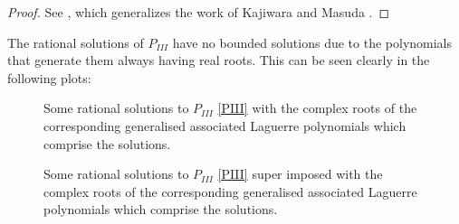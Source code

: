 \documentclass[12pt]{article}
\numberwithin{figure}{section}
\numberwithin{equation}{section}
\numberwithin{table}{section}
\begin{document}
\begin{proof}
See \cite{P:36:9532}, which generalizes the work of Kajiwara and Masuda \cite{P:A260:467}.
\end{proof}
The rational solutions of $P_{III}$ have no bounded solutions due to the polynomials that generate them always having real roots. This can be seen clearly in the following plots:
\begin{figure}[H]
\centering
{}
\caption{Some rational solutions to $P_{III}$ \eqref{PIII} with the complex roots of the corresponding generalised associated Laguerre polynomials which comprise the solutions.}
\end{figure}
\begin{figure}[H]
\centering
{}
\caption{Some rational solutions to $P_{III}$ \eqref{PIII} super imposed with the complex roots of the corresponding generalised associated Laguerre polynomials which comprise the solutions.}
\end{figure}
\end{document}
